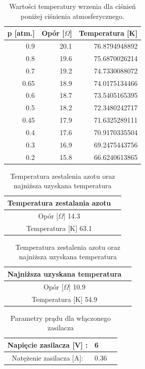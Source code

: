 \documentclass{article}
\begin{document}
\begin{table}[htbp]
\centering
\begin{tabular}{|r|r|r|}
\hline
\multicolumn{1}{|c|}{p [atm.]} & \multicolumn{1}{c|}{Opór [$\Omega$]} & \multicolumn{1}{c|}{Temperatura [K]} \\ \hline
0.9 & 20.1 & 76.8794948892 \\ \hline
0.8 & 19.6 & 75.6870026214 \\ \hline
0.7 & 19.2 & 74.7330088072 \\ \hline
0.65 & 18.9 & 74.0175134466 \\ \hline
0.6 & 18.7 & 73.5405165395 \\ \hline
0.5 & 18.2 & 72.3480242717 \\ \hline
0.45 & 17.9 & 71.6325289111 \\ \hline
0.4 & 17.6 & 70.9170335504 \\ \hline
0.3 & 16.9 & 69.2475443756 \\ \hline
0.2 & 15.8 & 66.6240613865 \\ \hline
\end{tabular}
\caption{Wartości temperatury wrzenia dla ciśnień poniżej ciśnienia atmosferycznego.}
\label{}
\end{table}

\begin{table}[htbp]
\centering
\begin{tabular}{|c|c|}
\hline
Temperatura zestalania azotu \\ \hline 
Opór [$\Omega$] 14.3 \\ \hline
Temperatura [K] 63.1 \\ \hline
\end{tabular}
\quad
\centering
\begin{tabular}{|c|c|}
\hline
Najniższa uzyskana temperatura \\ \hline 
Opór [$\Omega$] 10.9 \\ \hline
Temperatura [K] 54.9 \\ \hline
\end{tabular}
\caption{Temperatura zestalenia azotu oraz najniższa uzyskana temperatura}
\label{}
\end{table}

\begin{table}[htbp]
\centering
\begin{tabular}{|c|l|r|}
\hline
Napięcie zasilacza [V] : & 6 \\ \hline
Natężenie zasilacza [A]: & 0.36 \\ \hline
\end{tabular}
\caption{Parametry prądu dla włączonego zasilacza}
\label{}
\end{table}
\end{document}
